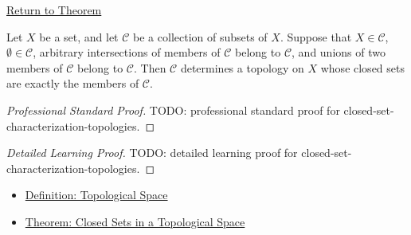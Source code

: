 \newpage
{}
\label{prf:closed-set-characterization-topologies}

\begin{remark*}[Return]
\hyperref[thm:closed-set-characterization-topologies]{Return to Theorem}
\end{remark*}

\begin{theorem*}
Let \(X\) be a set, and let \(\mathcal{C}\) be a collection of subsets of
\(X\).  Suppose that \(X\in\mathcal{C}\), \(\emptyset\in\mathcal{C}\),
arbitrary intersections of members of \(\mathcal{C}\) belong to
\(\mathcal{C}\), and unions of two members of \(\mathcal{C}\) belong to
\(\mathcal{C}\).  Then \(\mathcal{C}\) determines a topology on \(X\) whose
closed sets are exactly the members of \(\mathcal{C}\).
\end{theorem*}

\begin{proof}[Professional Standard Proof]
\LRAProofBodyStart
TODO: professional standard proof for closed-set-characterization-topologies.
\end{proof}

\begin{proof}[Detailed Learning Proof]
\LRAProofBodyStart
TODO: detailed learning proof for closed-set-characterization-topologies.
\end{proof}

\begin{remark*}
\end{remark*}

\begin{dependencies}
\begin{itemize}
  \item \hyperref[def:topological-space]{Definition: Topological Space}
  \item \hyperref[thm:closed-sets-in-topological-space]{Theorem: Closed Sets in a Topological Space}
\end{itemize}
\end{dependencies}

\clearpage
